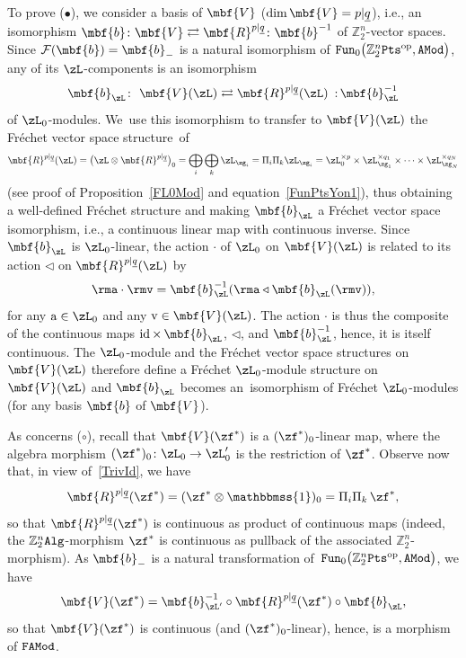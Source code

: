 \documentclass[10pt,a4paper]{amsart}
\newcommand{\Id}{\mathbbmss{1}}
\newcommand{\op}[1]{\operatorname{#1}}
\newcommand{\Z}{{\mathbb Z}}
\def\ul{\underline}
\def\cF{\mathcal{F}}
\def\ul{\underline}
\newcommand{\0}{\otimes}
\newcommand{\z}{\Z_2^n}
\numberwithin{equation}{section}
\begin{document}
To prove ($\bullet$), we consider a basis of $\mbf{V}$ ($\dim\mbf{V}=p|\ul q$), i.e., an isomorphism $\mbf{b}\colon \mbf{V}\rightleftarrows\mbf{R}^{p|\ul q}\colon \mbf{b}^{-1}$ of $\z$-vector spaces. Since $\cF(\mbf{b})=\mbf{b}_-$ is a natural isomorphism of ${\tt Fun}_0\big(\z{\tt Pts}^{\op{op}},{\tt AMod}\big)$, any of its $\zL$-components is an isomorphism
\[
\mbf{b}_\zL\colon\ \mbf{V}(\zL)\rightleftarrows\mbf{R}^{p|\ul q}(\zL)\ \,{:}\, \mbf{b}_\zL^{-1}
\]
of $\zL_0$-modules. We~use this isomorphism to transfer to $\mbf{V}(\zL)$ the Fr\'echet vector space struc\-ture~of
\begin{gather}\label{TrivId}
\mbf{R}^{p|\ul q}(\zL)=\big(\zL\0\mbf{R}^{p|\ul q}\big)_0=\bigoplus_i\bigoplus_k\zL_{\zg_i}=\Pi_i\Pi_k\zL_{\zg_i}=\zL_0^{\times p}\times\zL_{\zg_1}^{\times q_1}\times\cdots\times\zL_{\zg_N}^{\times q_N}
\end{gather}
(see proof of Proposition~\ref{FL0Mod} and equation~\eqref{FunPtsYon1}), thus obtaining a well-defined Fr\'echet structure and making $\mbf{b}_\zL$ a Fr\'echet vector space isomorphism, i.e., a continuous linear map with continuous inverse. Since $\mbf{b}_\zL$ is $\zL_0$-linear, the action $\cdot$ of $\zL_0$ on $\mbf{V}(\zL)$ is related to its action $\triangleleft$ on $\mbf{R}^{p|\ul q}(\zL)$ by
\[
\rma\cdot\rmv=\mbf{b}_\zL^{-1}(\rma\triangleleft\mbf{b}_\zL(\rmv)),
\]
for any $\textrm{a}\in\zL_0$ and any $\textrm{v}\in\mbf{V}(\zL)$. The action $\cdot$ is thus the composite of the continuous maps $\mathop{\rm id}\times\,\mbf{b}_\zL$, $\triangleleft$, and $\mbf{b}_\zL^{-1}$, hence, it is itself continuous. The $\zL_0$-module and the Fr\'echet vector space structures on $\mbf{V}(\zL)$ therefore define a Fr\'echet $\zL_0$-module structure on $\mbf{V}(\zL)$ and $\mbf{b}_\zL$ becomes an~isomorphism of Fr\'echet $\zL_0$-modules (for any basis $\mbf{b}$ of $\mbf{V}$).

As concerns ($\circ$), recall that $\mbf{V}(\zf^*)$ is a $(\zf^*)_0$-linear map, where the algebra morphism $(\zf^*)_0\colon \zL_0\to \zL'_0$ is the restriction of $\zf^*$. Observe now that, in view of~\eqref{TrivId}, we have
\[
\mbf{R}^{p|\ul q}(\zf^*)=(\zf^*\0\Id)_0=\Pi_i\Pi_k\,\zf^*,
\]
so that $\mbf{R}^{p|\ul q}(\zf^*)$ is continuous as product of continuous maps (indeed, the $\z\tt Alg$-morphism $\zf^*$ is continuous as pullback of the associated $\z$-morphism). As $\mbf{b}_-$ is a natural transformation of~${\tt Fun}_0\big(\z{\tt Pts}^{\op{op}},{\tt AMod}\big)$, we have
\[
\mbf{V}(\zf^*)=\mbf{b}_{\zL'}^{-1}\circ\mbf{R}^{p|\ul q}(\zf^*)\circ\mbf{b}_\zL,
\]
so that $\mbf{V}(\zf^*)$ is continuous (and $(\zf^*)_0$-linear), hence, is a morphism of $\tt FAMod$.
\end{document}
